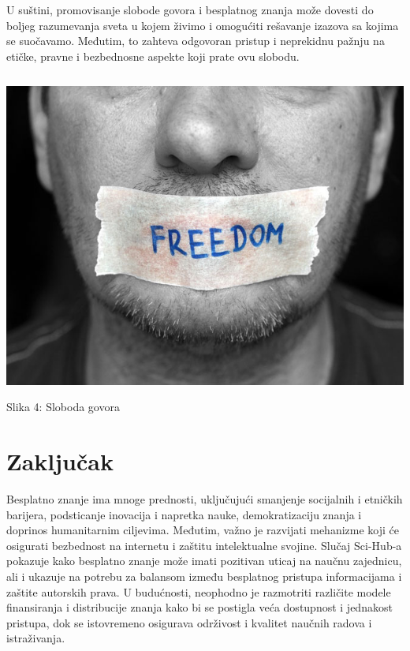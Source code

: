 \documentclass[a4paper]{article}
\begin{document}
{U suštini, promovisanje slobode govora i besplatnog znanja može dovesti do boljeg razumevanja sveta u kojem živimo i omogućiti rešavanje izazova sa kojima se suočavamo. Međutim, to zahteva odgovoran pristup i neprekidnu pažnju na etičke, pravne i bezbednosne aspekte koji prate ovu slobodu.


\begin{verbatim}

\end{verbatim}

\begin{center}
\includegraphics[scale=0.35]{sloboda_govora.jpg}
\end{center}
\caption{Slika 4: Sloboda govora}
\label{Sloboda govora}


\setlength{\parskip}{2em}


\setlength{\parskip}{1em}

\section{Zaključak}
\label{Zaključak}

Besplatno znanje ima mnoge prednosti, uključujući smanjenje socijalnih i etničkih barijera, podsticanje inovacija i napretka nauke, demokratizaciju znanja i doprinos humanitarnim ciljevima. Međutim, važno je razvijati mehanizme koji će osigurati bezbednost na internetu i zaštitu intelektualne svojine. Slučaj Sci-Hub-a pokazuje kako besplatno znanje može imati pozitivan uticaj na naučnu zajednicu, ali i ukazuje na potrebu za balansom između besplatnog pristupa informacijama i zaštite autorskih prava. U budućnosti, neophodno je razmotriti različite modele finansiranja i distribucije znanja kako bi se postigla veća dostupnost i jednakost pristupa, dok se istovremeno osigurava održivost i kvalitet naučnih radova i istraživanja.

}
\end{document}
